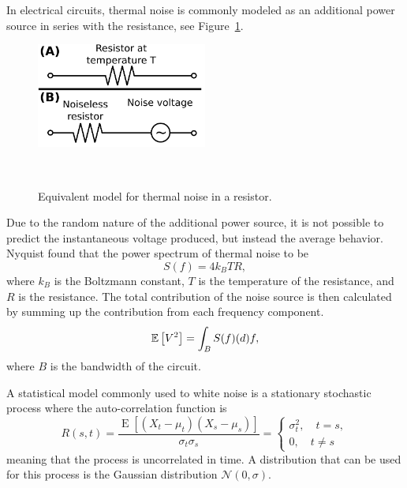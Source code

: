 In electrical circuits, thermal noise is commonly modeled as an additional
power source in series with the resistance, see Figure~\ref{fig:johnsonEquivalentNoise}.
\begin{figure}
  \centering
  \includegraphics[width=0.5\textwidth]{gfx/JohnsonNoiseEquivalentCircuits.png}
  \caption{Equivalent model for thermal noise in a resistor.}~\label{fig:johnsonEquivalentNoise}
\end{figure}
Due to the random nature of the additional power source, it is not
possible to predict the instantaneous voltage produced, but instead the
average behavior. Nyquist\cite{PhysRev.32.110} found that the power
spectrum of thermal noise to be
\begin{equation}
  \label{eq:power_spectrum_white_noise}
  S(f) = 4 k_B T R,
\end{equation}
where $k_B$ is the Boltzmann constant, $T$ is the temperature of the
resistance, and $R$ is the resistance. The total contribution of the
noise source is then calculated by summing up the contribution from
each frequency component.
\begin{equation}
  \label{eq:2}
  {\mathbb E} \left[ V^2 \right] = \int_B S(f) \mathrm(d) f,
\end{equation}
where $B$ is the bandwidth of the circuit.


A statistical model commonly used to white noise is a stationary stochastic
process where the auto-correlation function is
\begin{equation}
  \label{eq:autocorrelation_white_noise}
  R(s,t)={\frac {\operatorname {E} [(X_{t}-\mu _{t})(X_{s}-\mu
      _{s})]}{\sigma _{t}\sigma _{s}}} =
  \begin{cases}
    \sigma_{t}^2 , \quad t = s, \\
    0 , \quad t \neq s
  \end{cases}
\end{equation}
meaning that the process is uncorrelated in time. A distribution that
can be used for this process is the Gaussian distribution
$\mathcal{N}(0, \sigma)$.

